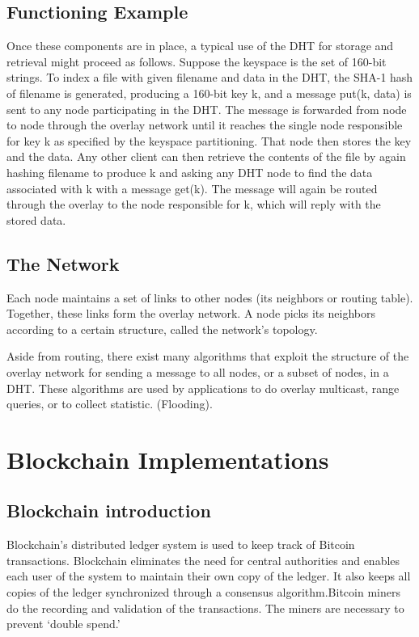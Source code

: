 \subsection{Functioning Example}
Once these components are in place, a typical use of the DHT for storage and retrieval might proceed as follows. Suppose the keyspace is the set of 160-bit strings. To index a file with given filename and data in the DHT, the SHA-1 hash of filename is generated, producing a 160-bit key k, and a message put(k, data) is sent to any node participating in the DHT. The message is forwarded from node to node through the overlay network until it reaches the single node responsible for key k as specified by the keyspace partitioning. That node then stores the key and the data. Any other client can then retrieve the contents of the file by again hashing filename to produce k and asking any DHT node to find the data associated with k with a message get(k). The message will again be routed through the overlay to the node responsible for k, which will reply with the stored data.

\subsection{The Network}
Each node maintains a set of links to other nodes (its neighbors or routing table). Together, these links form the overlay network. A node picks its neighbors according to a certain structure, called the network's topology.

Aside from routing, there exist many algorithms that exploit the structure of the overlay network for sending a message to all nodes, or a subset of nodes, in a DHT. These algorithms are used by applications to do overlay multicast, range queries, or to collect statistic. (Flooding).

\section{Blockchain Implementations}

\subsection*{Blockchain introduction}
Blockchain’s distributed ledger system is used to keep track of Bitcoin transactions. Blockchain eliminates the need for central authorities and enables each user of the system to maintain their own copy of the ledger. It also keeps all copies of the ledger synchronized through a consensus algorithm.Bitcoin miners do the recording and validation of the transactions. The miners are necessary to prevent ‘double spend.’
